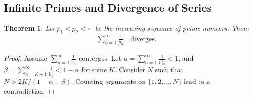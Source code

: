 \documentclass[9pt]{article}
\theoremstyle{definition}
\theoremstyle{plain}
\newtheorem{theorem}{Theorem}
\begin{document}
\subsection*{Infinite Primes and Divergence of Series}
\begin{theorem}
Let $ p_1 < p_2 < \cdots $ be the increasing sequence of prime numbers. Then:
\begin{align}
\sum_{n=1}^\infty \frac{1}{p_n} \quad \text{diverges}.
\end{align}
\end{theorem}

\begin{proof}
Assume $ \sum_{n=1}^\infty \frac{1}{p_n} $ converges. Let $ \alpha = \sum_{n=1}^\infty \frac{1}{p_{2n}^2} < 1 $, and $ \beta = \sum_{n=K+1}^\infty \frac{1}{p_n} < 1 - \alpha $ for some $ K $. Consider $ N $ such that $ N > 2K/(1 - \alpha - \beta) $. Counting arguments on $ \{1, 2, \ldots, N\} $ lead to a contradiction.
\end{proof}
\end{document}
